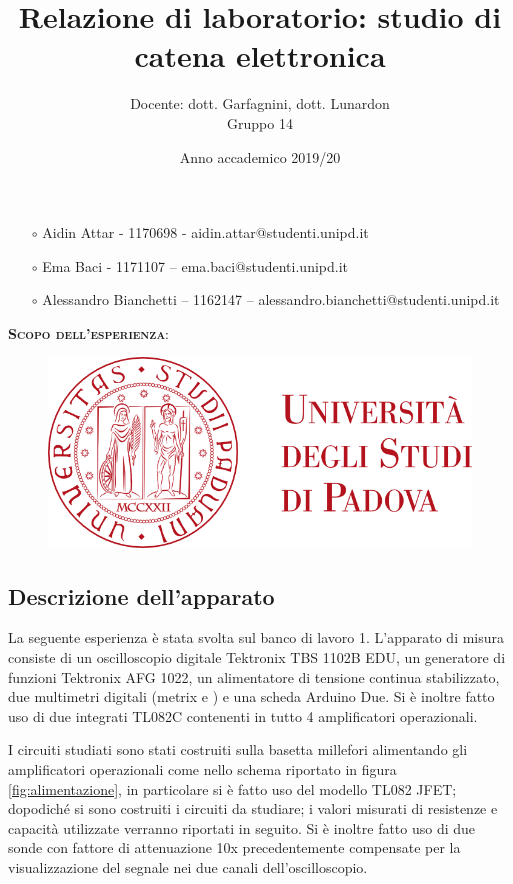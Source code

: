 \documentclass{article}
\title{Relazione di laboratorio: studio di catena elettronica}
\author{Docente: dott. Garfagnini, dott. Lunardon \\
Gruppo 14}
\date{Anno accademico 2019/20}
\begin{document}
\maketitle

\begin{itemize}
    \item[$\circ$] Aidin Attar - 1170698 - aidin.attar@studenti.unipd.it
    \item[$\circ$] Ema Baci - 1171107 – ema.baci@studenti.unipd.it
    \item[$\circ$] Alessandro Bianchetti – 1162147 – alessandro.bianchetti@studenti.unipd.it
\end{itemize}

\vspace{3 cm}
\begin{large}\textsc{\textbf{Scopo dell'esperienza}: } 
\end{large}
\vspace{8.5cm}

\begin{figure}[H]
\centering
\includegraphics[scale=0.5, angle=0]{unipd_logo.png}
\end{figure}


\twocolumn

\subsection*{Descrizione dell'apparato} La seguente esperienza è stata svolta sul banco di lavoro 1. L'apparato di misura consiste di 
un oscilloscopio digitale Tektronix TBS 1102B EDU, un generatore di funzioni Tektronix AFG 1022, un alimentatore di tensione continua stabilizzato,
due multimetri digitali (metrix e ) e una scheda Arduino Due. 
Si è inoltre fatto uso di due integrati TL082C contenenti in tutto 4 amplificatori operazionali.

I circuiti studiati sono stati costruiti sulla basetta millefori alimentando gli amplificatori operazionali come nello schema riportato 
in figura \ref{fig:alimentazione}, in particolare si è fatto uso del modello TL082 JFET; dopodiché si sono 
costruiti i circuiti da studiare;  i valori misurati di resistenze e capacità utilizzate verranno riportati in seguito.
Si è inoltre fatto uso di due sonde con fattore di attenuazione 10x precedentemente compensate per la visualizzazione del 
segnale nei due canali dell'oscilloscopio.
\end{document}
